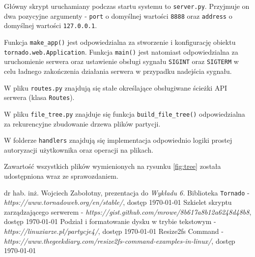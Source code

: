 \documentclass{article}
\begin{document}
Główny skrypt uruchamiany podczas startu systemu to \texttt{server.py}. Przyjmuje on dwa pozycyjne argumenty - \texttt{port} o domyślnej wartości \texttt{8888} oraz \texttt{address} o domyślnej wartości \texttt{127.0.0.1}.

Funkcja \texttt{make\_app()} jest odpowiedzialna za stworzenie i konfigurację obiektu \texttt{tornado.web.Application}. Funkcja \texttt{main()} jest natomiast odpowiedzialna za uruchomienie serwera oraz ustawienie obsługi sygnału \texttt{SIGINT} oraz \texttt{SIGTERM} w celu ładnego zakończenia działania serwera w przypadku nadejścia sygnału.

W pliku \texttt{routes.py} znajdują się stałe określające obsługiwane ścieżki API serwera (klasa \texttt{Routes}).

W pliku \texttt{file\_tree.py} znajduje się funkcja \texttt{build\_file\_tree()} odpowiedzialna za rekurencyjne zbudowanie drzewa plików partycji.

W folderze \texttt{handlers} znajdują się implementacja odpowiednio logiki prostej autoryzacji użytkownika oraz operacji na plikach.

Zawartość wszystkich plików wymienionych na rysunku \ref{fig:tree} została udostępniona wraz ze sprawozdaniem.


\begin{thebibliography}{9}
 dr hab. inż. Wojciech Zabołotny, prezentacja do \textit{Wykładu 6.}
 Biblioteka \texttt{Tornado} - \textit{https://www.tornadoweb.org/en/stable/}, dostęp \today
{} Szkielet skryptu zarządzającego serwerem - \textit{https://gist.github.com/mrowe/8b617a8b12a6248d48b8}, dostęp \today
{} Podział i formatowanie dysku w trybie tekstowym - \textit{https://linuxiarze.pl/partycje4/}, dostęp \today
{} Resize2fs Command - \textit{https://www.thegeekdiary.com/resize2fs-command-examples-in-linux/}, dostęp \today
\end{thebibliography}
\end{document}
